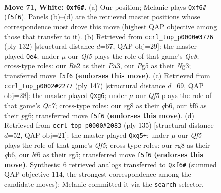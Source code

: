 \documentclass[11pt]{article}
\begin{document}
\clearpage

\begin{figure}[p]\centering
\begin{subfigure}{0.46\textwidth}\centering
\resizebox{\linewidth}{!}{%
\newchessgame
\chessboard[
  setfen={1q3kr1/8/5b2/5QP1/3P1P1p/7K/4R3/8 w - - 2 71},
  showmover=false,
  pgfstyle=straightmove, color=movearrow, markmove={f5-f6}
]}
\caption{}
\end{subfigure}\hfill
\begin{subfigure}{0.46\textwidth}\centering
\resizebox{\linewidth}{!}{%
\newchessgame
\chessboard[
  setfen={4Q3/5r1k/6q1/8/p7/P3KPN1/1P6/8 w - - 4 67},
  showmover=false,
  pgfstyle=straightmove, color=movearrow, markmove={e8-e4}
]}
\caption{}
\end{subfigure}
\\[4pt]
\begin{subfigure}{0.46\textwidth}\centering
\resizebox{\linewidth}{!}{%
\newchessgame
\chessboard[
  setfen={6k1/5p2/1Q2p1Pp/8/8/6P1/2q1BK2/8 b - - 0 74},
  showmover=false,
  pgfstyle=straightmove, color=movearrow, markmove={c2-g6}
]}
\caption{}
\end{subfigure}\hfill
\begin{subfigure}{0.46\textwidth}\centering
\resizebox{\linewidth}{!}{%
\newchessgame
\chessboard[
  setfen={8/6k1/1Q4p1/4p1R1/4pq2/8/2P2PK1/8 b - - 0 68},
  showmover=false,
  pgfstyle=straightmove, color=movearrow, markmove={f4-g5}
]}
\caption{}
\end{subfigure}
\caption{\textbf{Move 71, White: \texttt{Qxf6\#}.} (a) Our position; Melanie plays \texttt{Qxf6\#} (\texttt{f5f6}). Panels (b)--(d) are the retrieved master positions whose correspondence most drove this move (highest QAP objective among those that transfer to it). (b) Retrieved from \texttt{ccrl\_top\_p0000\#3776} (ply 132) [structural distance $d$=67, QAP obj=29]: the master played \texttt{Qe4}; under $\mu$ our \emph{Qf5} plays the role of that game's \emph{Qe8}; cross-type roles: our \emph{R}e2 as their \emph{P}a3, our \emph{P}g5 as their \emph{N}g3; transferred move \texttt{f5f6} \textbf{(endorses this move)}. (c) Retrieved from \texttt{ccrl\_top\_p0002\#2277} (ply 147) [structural distance $d$=69, QAP obj=28]: the master played \texttt{Qxg6}; under $\mu$ our \emph{Qf5} plays the role of that game's \emph{Qc7}; cross-type roles: our \emph{r}g8 as their \emph{q}b6, our \emph{b}f6 as their \emph{p}g6; transferred move \texttt{f5f6} \textbf{(endorses this move)}. (d) Retrieved from \texttt{ccrl\_top\_p0000\#2083} (ply 135) [structural distance $d$=52, QAP obj=21]: the master played \texttt{Qxg5+}; under $\mu$ our \emph{Qf5} plays the role of that game's \emph{Qf5}; cross-type roles: our \emph{r}g8 as their \emph{q}b6, our \emph{b}f6 as their \emph{r}g5; transferred move \texttt{f5f6} \textbf{(endorses this move)}. Synthesis: 6 retrieved analogs transferred to \texttt{Qxf6\#} (summed QAP objective 114, the strongest correspondence among the candidate moves); Melanie committed it via the \texttt{search} selector.}
\label{fig:thought-m140}
\end{figure}
\end{document}
